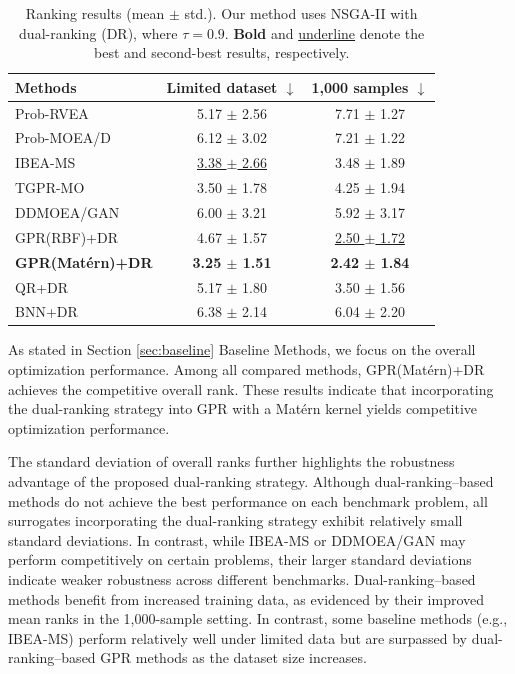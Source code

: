 \documentclass{article}
\begin{document}
\begin{table}[htbp]
\caption{Ranking results (mean $\pm$ std.). Our method uses NSGA-II with dual-ranking (DR), where $\tau=0.9$. \textbf{Bold} and \underline{underline} denote the best and second-best results, respectively.}
\label{tab:opt_baseline_ranks}
\centering
\begin{tabular}{lcc}
\toprule
Methods 
& Limited dataset $\downarrow$
& 1,000 samples $\downarrow$ \\
\midrule
Prob-RVEA          
& 5.17 $\pm$ 2.56 
& 7.71 $\pm$ 1.27 \\
Prob-MOEA/D        
& 6.12 $\pm$ 3.02 
& 7.21 $\pm$ 1.22 \\
IBEA-MS            
& \underline{3.38 $\pm$ 2.66} 
& 3.48 $\pm$ 1.89 \\
TGPR-MO            
& 3.50 $\pm$ 1.78 
& 4.25 $\pm$ 1.94 \\
DDMOEA/GAN         
& 6.00 $\pm$ 3.21 
& 5.92 $\pm$ 3.17 \\
GPR(RBF)+DR        
& 4.67 $\pm$ 1.57 
& \underline{2.50 $\pm$ 1.72} \\
\textbf{GPR(Mat\'ern)+DR} 
& \textbf{3.25 $\pm$ 1.51} 
& \textbf{2.42 $\pm$ 1.84} \\
QR+DR              
& 5.17 $\pm$ 1.80 
& 3.50 $\pm$ 1.56 \\
BNN+DR             
& 6.38 $\pm$ 2.14 
& 6.04 $\pm$ 2.20 \\
\bottomrule
\end{tabular}
\end{table}

As stated in Section \ref{sec:baseline} Baseline Methods, we focus on the overall optimization performance. Among all compared methods, GPR(Mat\'ern)+DR achieves the competitive overall rank. These results indicate that incorporating the dual-ranking strategy into GPR with a Mat\'ern kernel yields competitive optimization performance.

The standard deviation of overall ranks further highlights the robustness advantage of the proposed dual-ranking strategy. Although dual-ranking–based methods do not achieve the best performance on each benchmark problem, all surrogates incorporating the dual-ranking strategy exhibit relatively small standard deviations. In contrast, while IBEA-MS or DDMOEA/GAN may perform competitively on certain problems, their larger standard deviations indicate weaker robustness across different benchmarks. Dual-ranking–based methods benefit from increased training data, as evidenced by their improved mean ranks in the 1,000-sample setting. In contrast, some baseline methods (e.g., IBEA-MS) perform relatively well under limited data but are surpassed by dual-ranking–based GPR methods as the dataset size increases. 
\end{document}
